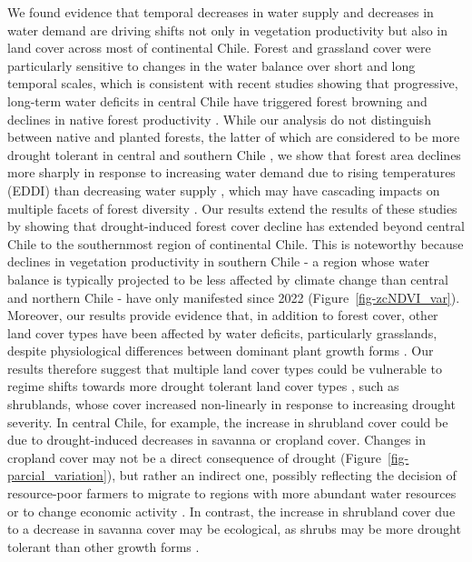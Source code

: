 \documentclass[
  sn-nature,
  numbered]{sn-jnl}
\begin{document}
We found evidence that temporal decreases in water supply and decreases
in water demand are driving shifts not only in vegetation productivity
but also in land cover across most of continental Chile. Forest and
grassland cover were particularly sensitive to changes in the water
balance over short and long temporal scales, which is consistent with
recent studies showing that progressive, long-term water deficits in
central Chile have triggered forest browning and declines in native
forest productivity \citep{Miranda2020, Venegas2022, Miranda2023}. While
our analysis do not distinguish between native and planted forests, the
latter of which are considered to be more drought tolerant in central
and southern Chile \citep{Carrasco2022}, we show that forest area
declines more sharply in response to increasing water demand due to
rising temperatures (EDDI) than decreasing water supply \citep[e.g.,
SPI, SSI,][]{Fajardo2019, Holz2018}, which may have cascading impacts on
multiple facets of forest diversity \citep{Segovia2021, Sabatini2022}.
Our results extend the results of these studies by showing that
drought-induced forest cover decline has extended beyond central Chile
to the southernmost region of continental Chile. This is noteworthy
because declines in vegetation productivity in southern Chile - a region
whose water balance is typically projected to be less affected by
climate change than central and northern Chile \citep{Breda2020} - have
only manifested since 2022 (Figure~\ref{fig-zcNDVI_var}). Moreover, our
results provide evidence that, in addition to forest cover, other land
cover types have been affected by water deficits, particularly
grasslands, despite physiological differences between dominant plant
growth forms \citep[e.g., trees, shrubs, C3 and C4
grasses,][]{Craine2013, McDowell2022}. Our results therefore suggest
that multiple land cover types could be vulnerable to regime shifts
towards more drought tolerant land cover types
\citep{Scheffer2001, Martinez-Vilalta2016}, such as shrublands, whose
cover increased non-linearly in response to increasing drought severity.
In central Chile, for example, the increase in shrubland cover could be
due to drought-induced decreases in savanna or cropland cover. Changes
in cropland cover may not be a direct consequence of drought
(Figure~\ref{fig-parcial_variation}), but rather an indirect one,
possibly reflecting the decision of resource-poor farmers to migrate to
regions with more abundant water resources or to change economic
activity \citep{AghaKouchak2021, Hermans2021}. In contrast, the increase
in shrubland cover due to a decrease in savanna cover may be ecological,
as shrubs may be more drought tolerant than other growth forms
\citep{Eldridge2011, Gotmark2016}.
\end{document}
